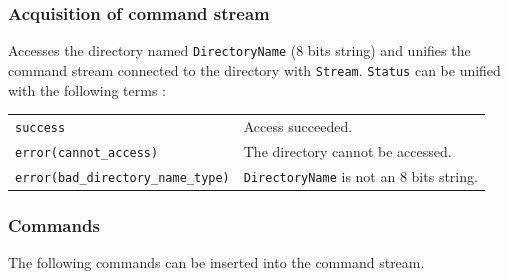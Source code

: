 \subsubsection{Acquisition of command stream}
\begin{itemize}

Accesses the directory named \verb|DirectoryName| (8 bits string) and
unifies the command stream connected to the directory with \verb|Stream|.
\verb|Status| can be unified with the following terms :

\vspace{1ex}

\hspace*{15mm}\begin{tabular}{l@{ $\cdots$ }l}
\verb|success| & Access succeeded.\\
\verb|error(cannot_access)| & The directory cannot be accessed.\\
\verb|error(bad_directory_name_type)| 
			& \verb|DirectoryName| is not an 8 bits string.\\
\end{tabular}
\end{itemize}

\subsubsection{Commands}

The following commands can be inserted into the command stream.

